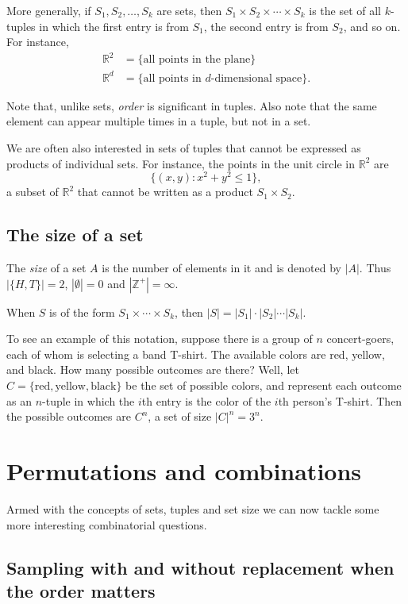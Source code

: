\documentclass{report}
\theoremstyle{plain}
\theoremstyle{definition}
\newcommand{\R}{\mathbb{R}}
\begin{document}
More generally, if $S_1, S_2, \ldots, S_k$ are sets, then 
$S_1 \times S_2 \times \cdots \times S_k$ is the set of all $k$-tuples in which
the first entry is from $S_1$, the second entry is from $S_2$, and so on. For
instance,
\begin{align*}
\mathbb{R}^2 &= \{\mbox{all points in the plane}\} \\
\mathbb{R}^d &= \{\mbox{all points in $d$-dimensional space}\} .
\end{align*}

Note that, unlike sets, {\em order} is significant in tuples. Also
note that the same element can appear multiple times in a tuple, but
not in a set.

We are often also interested in sets of tuples that cannot be expressed as 
products of individual sets. For instance, the points in the unit circle in
$\mathbb{R}^2$ are
$$ \{(x,y): x^2 + y^2 \leq 1 \},$$
a subset of $\R^2$ that cannot be written as a product $S_1 \times S_2$.

\subsection{The size of a set}

The {\em size} of a set $A$ is the number of elements in it and is denoted
by $|A|$. Thus $|\{H,T\}|=2$, $|\emptyset|=0$ and $|\mathbb{Z}^+|=\infty$.

When $S$ is of the form 
$S_1 \times \cdots \times S_k$, then
$|S| = |S_1| \cdot |S_2| \cdots |S_k|$.

To see an example of this notation, suppose there is a group of $n$
concert-goers, each of whom is selecting a band T-shirt. The available
colors are red, yellow, and black. How many possible outcomes are
there? Well, let $C = \{\mbox{red}, \mbox{yellow}, \mbox{black}\}$ be
the set of possible colors, and represent each outcome as an $n$-tuple
in which the $i$th entry is the color of the $i$th person's T-shirt.
Then the possible outcomes are $C^n$, a set of size $|C|^n = 3^n$.

\section{Permutations and combinations}

Armed with the concepts of sets, tuples and set size we can now tackle
some more interesting combinatorial questions.

\subsection{Sampling with and without replacement when the order matters}
\end{document}
